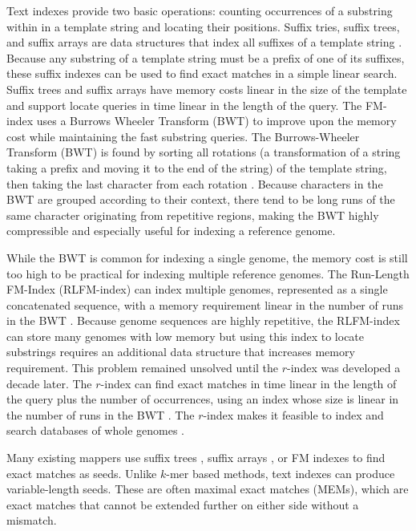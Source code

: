 \documentclass[11pt]{ucscthesis}
\begin{document}
Text indexes provide two basic operations: counting occurrences of a substring within in a template string and locating their positions.
Suffix tries, suffix trees, and suffix arrays are data structures that index all suffixes of a template string \cite{li_survey_2010}.
Because any substring of a template string must be a prefix of one of its suffixes, these suffix indexes can be used to find exact matches in a simple linear search.
Suffix trees and suffix arrays have memory costs linear in the size of the template and support locate queries in time linear in the length of the query.
The FM-index uses a Burrows Wheeler Transform (BWT) to improve upon the memory cost while maintaining the fast substring queries.
The Burrows-Wheeler Transform (BWT) is found by sorting all rotations (a transformation of a string taking a prefix and moving it to the end of the string) of the template string, then taking the last character from each rotation \cite{burrows_wheeler_1994}.
Because characters in the BWT are grouped according to their context, there tend to be long runs of the same character originating from repetitive regions, making the BWT highly compressible and especially useful for indexing a reference genome.


While the BWT is common for indexing a single genome, the memory cost is still too high to be practical for indexing multiple reference genomes.
The Run-Length FM-Index (RLFM-index) can index multiple genomes, represented as a single concatenated sequence, with a memory requirement linear in the number of runs in the BWT \cite{makinen_succinct_2005,makinen_storage_2010}.
Because genome sequences are highly repetitive, the RLFM-index can store many genomes with low memory but using this index to locate substrings requires an additional data structure that increases memory requirement.
This problem remained unsolved until the $r$-index was developed a decade later.
The $r$-index can find exact matches in time linear in the length of the query plus the number of occurrences, using an index whose size is linear in the number of runs in the BWT \cite{gagie_rindex_2020}.
The $r$-index makes it feasible to index and search databases of whole genomes \cite{rossi_moni_2022}.

Many existing mappers use suffix trees \cite{kurtz_versatile_2004}, suffix arrays \cite{abouelhoda_replacing_2004,hoffmann_fast_2009}, or FM indexes \cite{langmead_bowtie2_2012,li_bwa_mem_2013,li_soap2_2009,li_bwa_2009,langmead_bowtie_2009} to find exact matches as seeds.
Unlike $k$-mer based methods, text indexes can produce variable-length seeds.
These are often maximal exact matches (MEMs), which are exact matches that cannot be extended further on either side without a mismatch.
\end{document}
